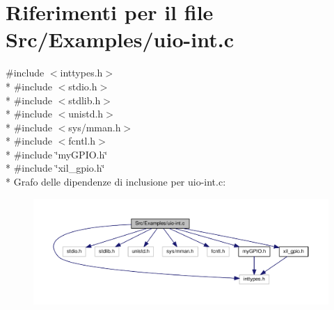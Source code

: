 \hypertarget{uio-int_8c}{\section{Riferimenti per il file Src/\+Examples/uio-\/int.c}
\label{uio-int_8c}
}
{\ttfamily \#include $<$inttypes.\+h$>$}\\*
{\ttfamily \#include $<$stdio.\+h$>$}\\*
{\ttfamily \#include $<$stdlib.\+h$>$}\\*
{\ttfamily \#include $<$unistd.\+h$>$}\\*
{\ttfamily \#include $<$sys/mman.\+h$>$}\\*
{\ttfamily \#include $<$fcntl.\+h$>$}\\*
{\ttfamily \#include \char`\"{}my\+G\+P\+I\+O.\+h\char`\"{}}\\*
{\ttfamily \#include \char`\"{}xil\+\_\+gpio.\+h\char`\"{}}\\*
Grafo delle dipendenze di inclusione per uio-\/int.c\+:\nopagebreak
\begin{figure}[H]
\begin{center}
\leavevmode
\includegraphics[width=350pt]{uio-int_8c__incl}
\end{center}
\end{figure}
